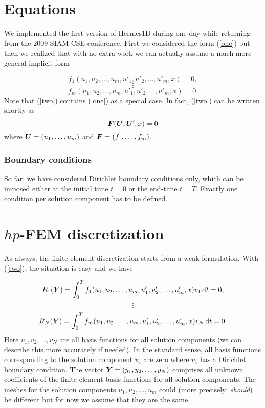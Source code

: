 \documentclass[12pt]{article}
\newcommand{\bfF}{\mbox{\boldmath $F$}}
\newcommand{\bfU}{\mbox{\boldmath $U$}}
\newcommand{\bfY}{\mbox{\boldmath $Y$}}
\def\be{\begin{equation}}
\def\ee{\end{equation}}
\def\d{\mbox{d}}
\begin{document}
\section{Equations}

We implemented the first version of Hermes1D during one day while returning
from the 2009 SIAM CSE conference. First we considered the form (\ref{one}) but
then we realized that with no extra work we can actually assume a much more
general implicit form

$$
f_1(u_1, u_2, \ldots, u_m, u'_1, u'_2, \ldots, u'_m, x) = 0,
$$
\be\label{two}
\vdots
\ee
$$
f_m(u_1, u_2, \ldots, u_m, u'_1, u'_2, \ldots, u'_m, x) = 0.
$$
Note that (\ref{two}) contains (\ref{one}) as a special case.
In fact, (\ref{two}) can be written shortly as
\be\label{qqq}
\bfF(\bfU, \bfU', x) = 0
\ee
where ${\bfU} = (u_1,\dots,u_m)$ and ${\bfF} = (f_1,\dots,f_m)$.

\subsubsection*{Boundary conditions}

So far, we have considered Dirichlet boundary conditions only, which can be
imposed either at the initial time $t = 0$ or the end-time $t = T$. Exactly one
condition per solution component has to be defined.


\section{$hp$-FEM discretization}

As always, the finite element discretization starts from a weak formulation.
With (\ref{two}), the situation is easy and we have

$$
R_1(\bfY) = \int_0^T f_1(u_1, u_2, \ldots, u_m, u'_1, u'_2, \ldots, u'_m, x)v_1 \, \d t = 0,
$$
\be\label{three}
\vdots
\ee
$$
R_N(\bfY) = \int_0^T f_m(u_1, u_2, \ldots, u_m, u'_1, u'_2, \ldots, u'_m, x)v_N \, \d t = 0.
$$
Here $v_1, v_2, \ldots, v_N$ are all basis functions for all solution
components (we can describe this more accurately if needed).  In the standard
sense, all basis functions corresponding to the solution component $u_i$ are
zero where $u_i$ has a Dirichlet boundary condition.  The vector $\bfY = (y_1,
y_2, \ldots, y_N)$ comprises all unknown coefficients of the finite element
basis functions for all solution components. The meshes for the solution
components $u_1, u_2, \ldots, u_m$ could (more precisely: {\em should}) be
different but for now we assume that they are the same.
\end{document}
